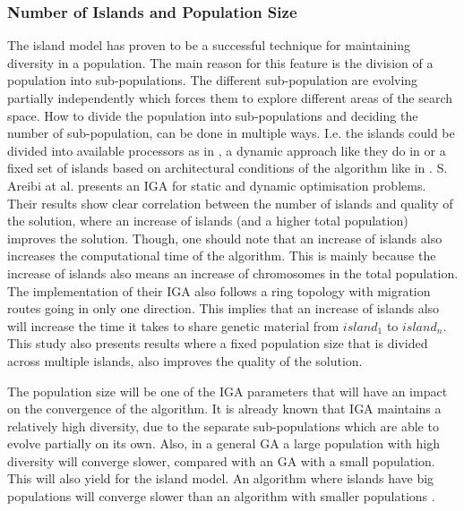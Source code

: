 \subsubsection{Number of Islands and Population Size}
The island model has proven to be a successful technique for maintaining diversity in a population. The main reason for this feature is the division of a population into sub-populations. The different sub-population are evolving partially independently which forces them to explore different areas of the search space. How to divide the population into sub-populations and deciding the number of sub-population, can be done in multiple ways. I.e. the islands could be divided into available processors as in \cite{IGA:attribute-reduction}, a dynamic approach like they do in \cite{IGA:dynamic_im_based_on_spectral_clustering_in_ga} or a fixed set of islands based on architectural conditions of the algorithm like in \cite{IGA:Gozali2018}.
S. Areibi at al.  \cite{IGA:advance-iga-for-optimization-problems} presents an IGA for static and dynamic optimisation problems. Their results show clear correlation between the number of islands and quality of the solution, where an increase of islands (and a higher total population) improves the solution. Though, one should note that an increase of islands also increases the computational time of the algorithm. This is mainly because the increase of islands also means an increase of chromosomes in the total population. The implementation of their IGA also follows a ring topology with migration routes going in only one direction. This implies that an increase of islands also will increase the time it takes to share genetic material from $island_1$ to $island_n$. This study also presents results where a fixed population size that is divided across multiple islands, also improves the quality of the solution.

The population size will be one of the IGA parameters that will have an impact on the convergence of the algorithm. It is already known that IGA maintains a relatively high diversity, due to the separate sub-populations which are able to evolve partially on its own. \cite{IGA:dynamic_im_based_on_spectral_clustering_in_ga} Also, in a general GA a large population with high diversity will converge slower, compared with an GA with a small population. This will also yield for the island model. An algorithm where islands have big populations will converge slower than an algorithm with smaller populations \cite{IGA:separability_popuplation_size_and_convergence}. 


